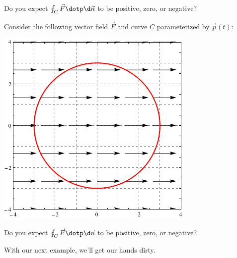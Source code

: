 \documentclass{ximera}
\begin{document}
\begin{question}
\begin{question}
\begin{image}
  \end{image}
  Do you expect $\oint_C\vec{F} \dotp \d\vec{n}$ to be positive, zero,
  or negative?
  \begin{prompt}
    \begin{multipleChoice}
    \end{multipleChoice}
  \end{prompt}  \begin{question}
  Consider the following vector field $\vec{F}$ and curve $C$
  parameterized by $\vec{p}(t)$:
  \begin{image}
    \includegraphics{circZeroDivVecField.png}
  \end{image}
  Do you expect $\oint_C\vec{F} \dotp \d\vec{n}$ to be positive, zero,
  or negative?
  \begin{prompt}
    \begin{multipleChoice}
    \end{multipleChoice}
  \end{prompt}
  \end{question}
\end{question}
\end{question}

With our next example, we'll get our hands dirty.
\end{document}
